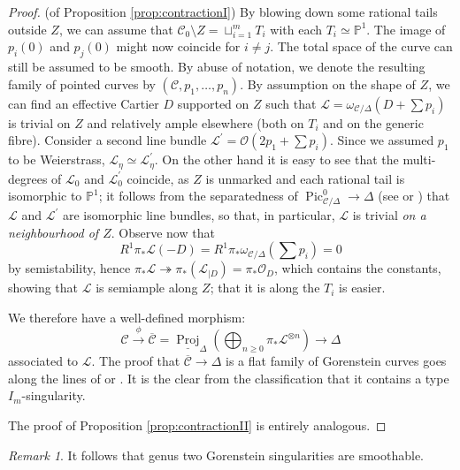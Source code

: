 \documentclass{compositio}
\newcommand{\PP}{\mathbb P}
\newcommand{\OO}{\mathcal O}
\renewcommand{\to}{\rightarrow}
\newcommand{\dvr}{\Delta}
\newcommand{\Pic}{\operatorname{Pic}}
\theoremstyle{plain}
\theoremstyle{definition}
\theoremstyle{remark}
\newtheorem{rem}[thm]{Remark}
\begin{document}
\begin{proof}(of Proposition \ref{prop:contractionI})
 By blowing down some rational tails outside $Z$, we can assume that $\mathcal C_0\setminus Z=\sqcup_{i=1}^m T_i$ with each $T_i\simeq\PP^1$. The image of $p_i(0)$ and $p_j(0)$ might now coincide for $i\neq j$. The total space of the curve can still be assumed to be smooth. By abuse of notation, we denote the resulting family of pointed curves by $(\mathcal C,p_1,\ldots,p_n)$. By assumption on the shape of $Z$, we can find an effective Cartier $D$ supported on $Z$ such that $\mathcal L=\omega_{\mathcal C/\dvr}(D+\sum p_i)$ is trivial on $Z$ and relatively ample elsewhere (both on $T_i$ and on the generic fibre). Consider a second line bundle $\mathcal L^\prime=\OO(2p_1+\sum p_i)$. Since we assumed $p_1$ to be Weierstrass, $\mathcal L_\eta\simeq\mathcal L^\prime_\eta$. On the other hand it is easy to see that the multi-degrees of $\mathcal L_0$ and $\mathcal L^\prime_0$ coincide, as $Z$ is unmarked and each rational tail is isomorphic to $\PP^1$; it follows from the separatedness of $\Pic^0_{\mathcal C/\dvr}\to\dvr$ (see \cite[p. 136]{Deligne-Gabber} or \cite[\S 9.4]{BLR}) that $\mathcal L$ and $\mathcal L^\prime$ are isomorphic line bundles, so that, in particular, $\mathcal L$ is trivial \emph{on a neighbourhood of $Z$}. Observe now that 
 \[R^1\pi_*\mathcal L(-D)= R^1\pi_*\omega_{\mathcal C/\dvr}(\sum p_i)=0\]
 by semistability, hence $\pi_*\mathcal L\twoheadrightarrow \pi_*(\mathcal L_{|D})=\pi_*\OO_D$, which contains the constants, showing that $\mathcal L$ is semiample along $Z$; that it is along the $T_i$ is easier.
 
 We therefore have a well-defined  morphism:
 \[\mathcal C\xrightarrow{\phi}\overline{\mathcal C}=\underline{\operatorname{Proj}}_\dvr\left(\bigoplus_{n\geq 0}\pi_*\mathcal L^{\otimes n}\right)\to\dvr\]
 associated to $\mathcal L$. The proof that $\overline{\mathcal C}\to \dvr$ is a flat family of Gorenstein curves goes along the lines of \cite[Lemma 2.13]{SMY1} or \cite[Proposition 3.7.3.1]{RSPW1}. It is the clear from the classification that it contains a type $I_m$-singularity.
 
 The proof of Proposition \ref{prop:contractionII} is entirely analogous.
\end{proof}

\begin{rem}
 It follows that genus two Gorenstein singularities are smoothable.
\end{rem}
\end{document}
